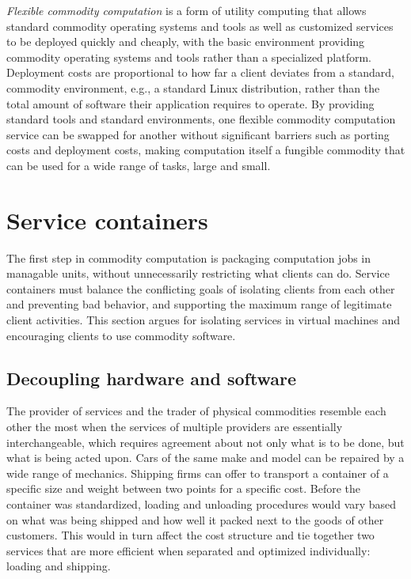 \emph{Flexible commodity computation} is a form of utility computing that allows standard commodity operating systems and tools as well as customized services to be deployed quickly and cheaply, with the basic environment providing commodity operating systems and tools rather than a specialized platform. Deployment costs are proportional to how far a client deviates from a standard, commodity environment, e.g., a standard Linux distribution, rather than the total amount of software their application requires to operate. By providing standard tools and standard environments, one flexible commodity computation service can be swapped for another without significant barriers such as porting costs and deployment costs, making computation itself a fungible commodity that can be used for a wide range of tasks, large and small.

\section{Service containers}

The first step in commodity computation is packaging computation jobs in managable units, without unnecessarily restricting what clients can do. Service containers must balance the conflicting goals of isolating clients from each other and preventing bad behavior, and supporting the maximum range of legitimate client activities. This section argues for isolating services in virtual machines and encouraging clients to use commodity software.

\subsection{Decoupling hardware and software}

The provider of services and the trader of physical commodities resemble each other the most when the services of multiple providers are essentially interchangeable, which requires agreement about not only what is to be done, but what is being acted upon. Cars of the same make and model can be repaired by a wide range of mechanics. Shipping firms can offer to transport a container of a specific size and weight between two points for a specific cost. Before the container was standardized, loading and unloading procedures would vary based on what was being shipped and how well it packed next to the goods of other customers. This would in turn affect the cost structure and tie together two services that are more efficient when separated and optimized individually: loading and shipping.

